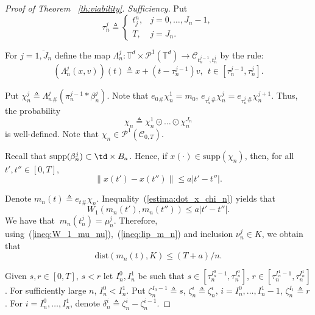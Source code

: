 \documentclass[12pt]{article}
\newcommand{\tdxptd}{\mathbb{T}^d\times\mathcal{P}^1(\mathbb{T}^d)}
\newcommand{\pc}[2]{\mathcal{P}^1(\mathcal{C}_{{#1},{#2}})}
\begin{document}
\begin{proof}[Proof of Theorem ~\ref{th:viability}. Sufficiency]
Put $$\tau_n^j\triangleq\left\{\begin{array}{ll}
t_j^n, & j=0,\ldots, J_n-1,\\
T, & j=J_n.
\end{array}\right.$$ 

For $j=\overline{1,J_n}$ define the map $\Lambda^j_n:\tdxptd\rightarrow\mathcal{C}_{t_n^{j-1},t_n^{j}}$ by the rule: 
$$(\Lambda^j_n(x,v))(t)\triangleq x+(t-\tau_n^{j-1})v,\ \ t\in[\tau_n^{j-1},\tau_n^{j}]. $$

Put $\chi_n^j\triangleq \Lambda_n^j{}_\#(\pi_n^{j-1}*\beta_n^{j})$. Note that $e_{0}{}_\#\chi_n^1=m_0$, $e_{\tau_n^{j}}{}_\#\chi_n^j=e_{\tau_n^{j}}{}_\#\chi_n^{j+1}$. Thus,
the probability $$\chi_n\triangleq \chi_n^1\odot\ldots\odot\chi_n^{J_n}$$ is well-defined. Note  that $\chi_n\in\pc{0}{T}$.

Recall that $\operatorname{supp}(\beta_n^j)\subset \td\times B_a$. Hence, if $x(\cdot)\in \mathrm{supp}(\chi_n)$, then, for all $t',t''\in [0,T]$, \begin{equation}\label{estima:dot_x_chi_n}
\|x(t')-x(t'')\|\leq a|t'-t''|. 
\end{equation}

Denote $m_n(t)\triangleq e_t{}_\#\chi_n$. Inequality~(\ref{estima:dot_x_chi_n}) yields that 
\begin{equation}\label{ineq:lip_m_n}
W_1(m_n(t'),m_n(t''))\leq a|t'-t''|.
\end{equation}
We have that
$\ m_n(t_n^j)=\mu_n^j. $ Therefore, using~(\ref{ineq:W_1_mu_nu}),~(\ref{ineq:lip_m_n}) and inclusion $\nu_n^j\in K$, we obtain that
\begin{equation}\label{ineq:dist_m_n_K}
\mathrm{dist}(m_n(t),K)\leq (T+a)/n.
\end{equation}

Given $s,r\in [0,T]$, $s<r$ let $I^0_n,I^1_n$ be such that $s\in [\tau_n^{I^0_n-1},\tau_n^{I^0_n}]$, $r\in [\tau_n^{I^1_n-1},\tau_n^{I^1_n}]$. For sufficiently large $n$, $I^0_n<I_n^1$. Put $\zeta_n^{I_0-1}\triangleq s$, $\zeta_n^{i}\triangleq \zeta_n^{i}$, $i=I_n^0,\ldots, I_n^1-1$, $\zeta_n^{I_1}\triangleq r$. For $i=I_n^0,\ldots, I_n^1$, denote $\delta^i_n\triangleq \zeta_n^i-\zeta_n^{i-1}$. 


\end{proof}
\end{document}
